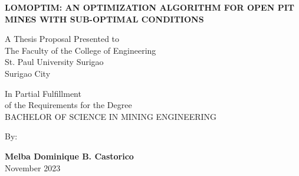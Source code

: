 \documentclass[12pt]{report}
\newcommand{\authora}{
    Melba Dominique B. Castorico %
}
\newcommand{\thetitle}{LOMOPTIM: An Optimization Algorithm for Open Pit Mines with Sub-Optimal Conditions}
\begin{document}
\thispagestyle{empty}

\begin{center}

\textbf{\MakeUppercase{\thetitle}}

\vspace{1.5cm}
A Thesis Proposal Presented to \\
The Faculty of the College of Engineering \\
St. Paul University Surigao \\
Surigao City

\vfill

In Partial Fulfillment \\
of the Requirements for the Degree \\
BACHELOR OF SCIENCE IN MINING ENGINEERING

\vspace{1cm}
By:

\vspace{1cm}
\textbf{\authora} \\

\vspace{1cm}
November 2023

\end{center}


\pagestyle{fancy}
\fancyhead{}
\fancyfoot{}
\fancyhead[R]{\thepage}

\tableofcontents

\end{document}
